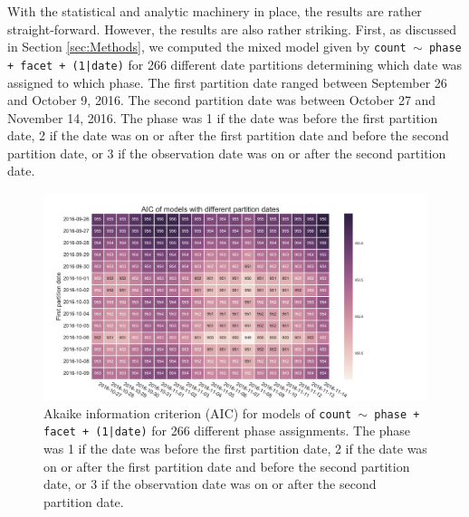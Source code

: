 With the statistical and analytic machinery in place, the results are 
rather straight-forward. However, the results are also rather striking. 
First, as discussed in Section \ref{sec:Methods}, we computed the mixed model
given by \texttt{count $\sim$ phase + facet + (1|date)} for 266 different date
partitions determining which date was assigned to which phase. The first
partition date ranged between September 26 and October 9, 2016. The
second partition date was between October 27 and November 14, 2016.
The phase was 1 if the date was before the first partition date, 2 if the 
date was on or after the first partition date and before the 
second partition date, or 3 if the observation date was on or after the second 
partition date.


\begin{figure}
  \centering
  \hspace*{-.25in}
  \includegraphics[width=1.25\textwidth]{figures/AIC_dates-FIG2.pdf}

\caption{
  Akaike information criterion (AIC) for models of \texttt{count $\sim$ phase + facet + (1|date)}
  for 266 different phase assignments. The phase was 1 if the date was before
  the first partition date, 2 if the date was on or after
  the first partition date and before the second partition date, or
  3 if the observation date was on or after the second partition date.
}
\label{fig:AICs}
\end{figure}


